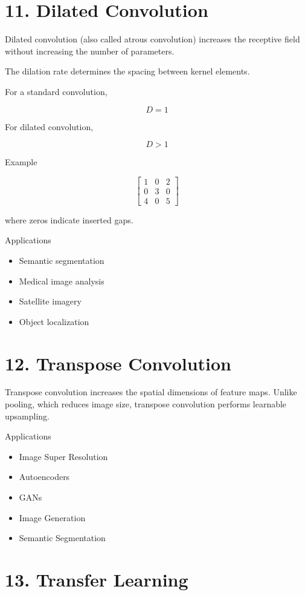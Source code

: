 \documentclass[11pt]{article}
\begin{document}
\section*{11. Dilated Convolution}

Dilated convolution (also called atrous convolution) increases the
receptive field without increasing the number of parameters.

The dilation rate determines the spacing between kernel elements.

For a standard convolution,

\[
D=1
\]

For dilated convolution,

\[
D>1
\]

Example

\[
\begin{bmatrix}
1 & 0 & 2\\
0 & 3 & 0\\
4 & 0 & 5
\end{bmatrix}
\]

where zeros indicate inserted gaps.

Applications

\begin{itemize}
\item Semantic segmentation
\item Medical image analysis
\item Satellite imagery
\item Object localization
\end{itemize}

\section*{12. Transpose Convolution}

Transpose convolution increases the spatial dimensions of feature maps.
Unlike pooling, which reduces image size, transpose convolution performs
learnable upsampling.

Applications

\begin{itemize}
\item Image Super Resolution
\item Autoencoders
\item GANs
\item Image Generation
\item Semantic Segmentation
\end{itemize}

\section*{13. Transfer Learning}
\end{document}
